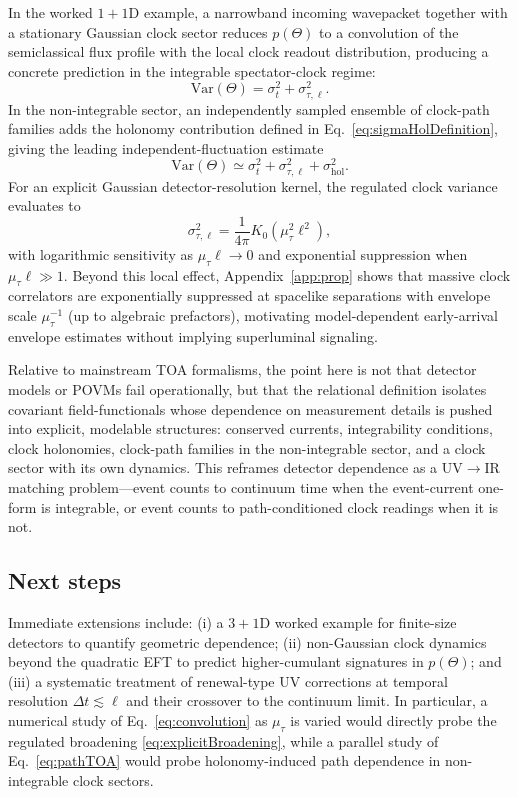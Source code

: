 \documentclass[11pt, a4paper]{article}
\theoremstyle{definition}
\theoremstyle{plain}
\theoremstyle{remark}
\numberwithin{equation}{section}
\begin{document}
    In the worked $1+1$D example, a narrowband incoming wavepacket together with a stationary Gaussian clock sector reduces $p(\Theta)$ to a convolution of the semiclassical flux profile with the local clock readout distribution, producing a concrete prediction in the integrable spectator-clock regime:
    \begin{equation}
        \mathrm{Var}(\Theta)=\sigma_t^2+\sigma_{\tau,\ell}^2.
    \end{equation}
    In the non-integrable sector, an independently sampled ensemble of clock-path families adds the holonomy contribution defined in Eq.~\eqref{eq:sigmaHolDefinition}, giving the leading independent-fluctuation estimate
    \begin{equation}
        \mathrm{Var}(\Theta)\simeq
        \sigma_t^2+\sigma_{\tau,\ell}^2+\sigma_{\mathrm{hol}}^2 .
    \end{equation}
    For an explicit Gaussian detector-resolution kernel, the regulated clock variance evaluates to
    \begin{equation}
        \sigma_{\tau,\ell}^2=
        \frac{1}{4\pi}K_0(\mu_\tau^2\ell^2),
    \end{equation}
    with logarithmic sensitivity as $\mu_\tau\ell\to0$ and exponential suppression when $\mu_\tau\ell\gg1$. Beyond this local effect, Appendix~\ref{app:prop} shows that massive clock correlators are exponentially suppressed at spacelike separations with envelope scale $\mu_\tau^{-1}$ (up to algebraic prefactors), motivating model-dependent early-arrival envelope estimates without implying superluminal signaling.
    
    Relative to mainstream TOA formalisms, the point here is not that detector models or POVMs fail operationally, but that the relational definition isolates covariant field-functionals whose dependence on measurement details is pushed into explicit, modelable structures: conserved currents, integrability conditions, clock holonomies, clock-path families in the non-integrable sector, and a clock sector with its own dynamics. This reframes detector dependence as a UV$\rightarrow$IR matching problem---event counts to continuum time when the event-current one-form is integrable, or event counts to path-conditioned clock readings when it is not.
    
    \subsection*{Next steps}
        Immediate extensions include: (i) a $3+1$D worked example for finite-size detectors to quantify geometric dependence; (ii) non-Gaussian clock dynamics beyond the quadratic EFT to predict higher-cumulant signatures in $p(\Theta)$; and (iii) a systematic treatment of renewal-type UV corrections at temporal resolution $\Delta t\lesssim \ell$ and their crossover to the continuum limit. In particular, a numerical study of Eq.~\eqref{eq:convolution} as $\mu_\tau$ is varied would directly probe the regulated broadening \eqref{eq:explicitBroadening}, while a parallel study of Eq.~\eqref{eq:pathTOA} would probe holonomy-induced path dependence in non-integrable clock sectors.
\end{document}
